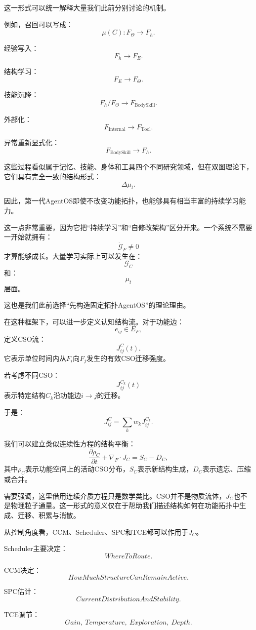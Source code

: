 这一形式可以统一解释大量我们此前分别讨论的机制。

例如，召回可以写成：
\[
\mu(C):
F_\Theta
\rightarrow
F_h.
\]

经验写入：
\[
F_h
\rightarrow
F_E.
\]

结构学习：
\[
F_E
\rightarrow
F_\Theta.
\]

技能沉降：
\[
F_h/F_\Theta
\rightarrow
F_{\text{BodySkill}}.
\]

外部化：
\[
F_{\text{Internal}}
\rightarrow
F_{\text{Tool}}.
\]

异常重新显式化：
\[
F_{\text{BodySkill}}
\rightarrow
F_h.
\]

这些过程看似属于记忆、技能、身体和工具四个不同研究领域，但在双图理论下，它们具有完全一致的结构形式：
\[
\boxed{
\Delta\mu_t.
}
\]

因此，第一代AgentOS即使不改变功能拓扑，也能够具有相当丰富的持续学习能力。

这一点非常重要，因为它把“持续学习”和“自修改架构”区分开来。一个系统不需要一开始就拥有：
\[
\dot{\mathcal G}_F\neq0
\]
才算能够成长。大量学习实际上可以发生在：
\[
\mathcal G_C
\]
和：
\[
\mu_t
\]
层面。

这也是我们此前选择“先构造固定拓扑AgentOS”的理论理由。

在这种框架下，可以进一步定义认知结构流。对于功能边：
\[
e_{ij}\in E_F,
\]
定义CSO流：
\[
J^{C}_{ij}(t).
\]
它表示单位时间内从$F_i$向$F_j$发生的有效CSO迁移强度。

若考虑不同CSO：
\[
J^{C_k}_{ij}(t)
\]
表示特定结构$C_k$沿功能边$i\rightarrow j$的迁移。

于是：
\[
J^{C}_{ij}
=
\sum_k
w_kJ^{C_k}_{ij}.
\]

我们可以建立类似连续性方程的结构平衡：
\[
\frac{\partial\rho_C}{\partial t}
+
\nabla_F\cdot J_C
=
S_C-D_C,
\]
其中$\rho_C$表示功能空间上的活动CSO分布，$S_C$表示新结构生成，$D_C$表示遗忘、压缩或合并。

需要强调，这里借用连续介质方程只是数学类比。CSO并不是物质流体，$J_C$也不是物理粒子通量。这一形式的意义仅在于帮助我们描述结构如何在功能拓扑中生成、迁移、积累与消散。

从控制角度看，CCM、Scheduler、SPC和TCE都可以作用于$J_C$。

Scheduler主要决定：
\[
WhereToRoute.
\]

CCM决定：
\[
HowMuchStructureCanRemainActive.
\]

SPC估计：
\[
CurrentDistributionAndStability.
\]

TCE调节：
\[
Gain,\ Temperature,\ Exploration,\ Depth.
\]

